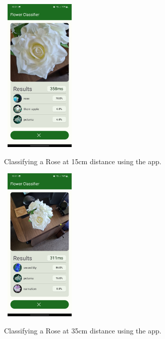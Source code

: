 \documentclass[12pt,a4paper]{report}
\begin{document}
\begin{figure}[h]\
    \includegraphics[width=0.3\textwidth]{rose_15cm.jpg}
    \caption{Classifying a Rose at 15cm distance using the app.}
    \label{fig:rose_15}
\end{figure}

\begin{figure}[h]\
    \includegraphics[width=0.3\textwidth]{rose_35cm.jpg}
    \caption{Classifying a Rose at 35cm distance using the app.}
    \label{fig:rose_35}
\end{figure}
\end{document}
